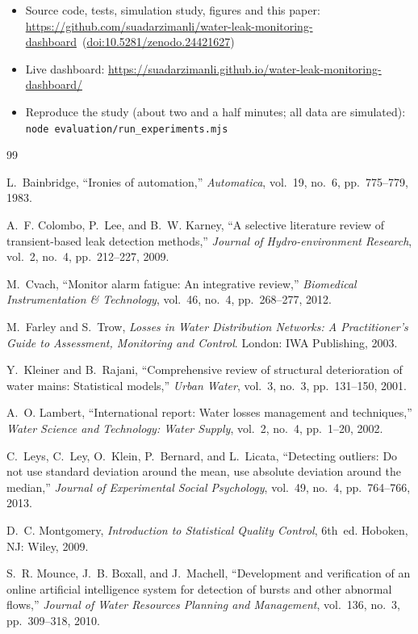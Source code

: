 \documentclass[11pt,a4paper]{article}
\newcommand{\repourl}{https://github.com/suadarzimanli/water-leak-monitoring-dashboard}
\newcommand{\appurl}{https://suadarzimanli.github.io/water-leak-monitoring-dashboard/}
\newcommand{\archivedoi}{~(\href{https://doi.org/10.5281/zenodo.24421627}{doi:10.5281/zenodo.24421627})}
\begin{document}
\begin{itemize}[leftmargin=1.2em]
  \item Source code, tests, simulation study, figures and this paper: \url{\repourl}\archivedoi
  \item Live dashboard: \url{\appurl}
  \item Reproduce the study (about two and a half minutes; all data are simulated):\\ \texttt{node evaluation/run\_experiments.mjs}
\end{itemize}

\begin{thebibliography}{99}
\small

 L.~Bainbridge, ``Ironies of automation,'' \emph{Automatica}, vol.~19, no.~6, pp.~775--779, 1983.

 A.~F. Colombo, P.~Lee, and B.~W. Karney, ``A selective literature review of transient-based leak detection methods,'' \emph{Journal of Hydro-environment Research}, vol.~2, no.~4, pp.~212--227, 2009.

 M.~Cvach, ``Monitor alarm fatigue: An integrative review,'' \emph{Biomedical Instrumentation \& Technology}, vol.~46, no.~4, pp.~268--277, 2012.

 M.~Farley and S.~Trow, \emph{Losses in Water Distribution Networks: A Practitioner's Guide to Assessment, Monitoring and Control}. London: IWA Publishing, 2003.

 Y.~Kleiner and B.~Rajani, ``Comprehensive review of structural deterioration of water mains: Statistical models,'' \emph{Urban Water}, vol.~3, no.~3, pp.~131--150, 2001.

 A.~O. Lambert, ``International report: Water losses management and techniques,'' \emph{Water Science and Technology: Water Supply}, vol.~2, no.~4, pp.~1--20, 2002.

 C.~Leys, C.~Ley, O.~Klein, P.~Bernard, and L.~Licata, ``Detecting outliers: Do not use standard deviation around the mean, use absolute deviation around the median,'' \emph{Journal of Experimental Social Psychology}, vol.~49, no.~4, pp.~764--766, 2013.

 D.~C. Montgomery, \emph{Introduction to Statistical Quality Control}, 6th~ed. Hoboken, NJ: Wiley, 2009.

 S.~R. Mounce, J.~B. Boxall, and J.~Machell, ``Development and verification of an online artificial intelligence system for detection of bursts and other abnormal flows,'' \emph{Journal of Water Resources Planning and Management}, vol.~136, no.~3, pp.~309--318, 2010.


\end{thebibliography}
\end{document}
